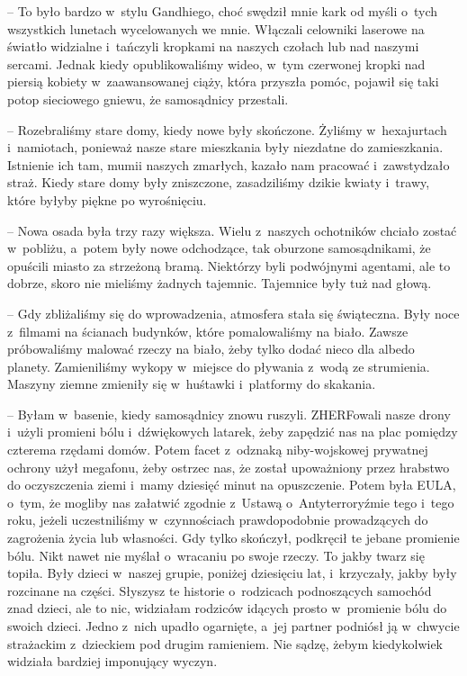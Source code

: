 \documentclass[oneside,polish,11pt,sfheadings]{mwbk}
\begin{document}
-- To było bardzo w~stylu Gandhiego, choć swędził mnie kark od myśli o~tych wszystkich lunetach wycelowanych we mnie. Włączali celowniki
laserowe na światło widzialne i~tańczyli kropkami na naszych czołach lub
nad naszymi sercami. Jednak kiedy opublikowaliśmy wideo, w~tym czerwonej
kropki nad piersią kobiety w~zaawansowanej ciąży, która przyszła pomóc,
pojawił się taki potop sieciowego gniewu, że samosądnicy przestali.

-- Rozebraliśmy stare domy, kiedy nowe były skończone. Żyliśmy w~hexajurtach i~namiotach, ponieważ nasze stare mieszkania były niezdatne
do zamieszkania. Istnienie ich tam, mumii naszych zmarłych, kazało nam
pracować i~zawstydzało straż. Kiedy stare domy były zniszczone,
zasadziliśmy dzikie kwiaty i~trawy, które byłyby piękne po wyrośnięciu.

-- Nowa osada była trzy razy większa. Wielu z~naszych ochotników chciało
zostać w~pobliżu, a~potem były nowe odchodzące, tak oburzone
samosądnikami, że opuścili miasto za strzeżoną bramą. Niektórzy byli
podwójnymi agentami, ale to dobrze, skoro nie mieliśmy żadnych tajemnic.
Tajemnice były tuż nad głową.

-- Gdy zbliżaliśmy się do wprowadzenia, atmosfera stała się świąteczna.
Były noce z~filmami na ścianach budynków, które pomalowaliśmy na biało.
Zawsze próbowaliśmy malować rzeczy na biało, żeby tylko dodać nieco dla
albedo planety. Zamieniliśmy wykopy w~miejsce do pływania z~wodą ze
strumienia. Maszyny ziemne zmieniły się w~huśtawki i~platformy do
skakania.

-- Byłam w~basenie, kiedy samosądnicy znowu ruszyli. ZHERFowali nasze
drony i~użyli promieni bólu i~dźwiękowych latarek, żeby zapędzić nas na
plac pomiędzy czterema rzędami domów. Potem facet z~odznaką
niby-wojskowej prywatnej ochrony użył megafonu, żeby ostrzec nas, że
został upoważniony przez hrabstwo do oczyszczenia ziemi i~mamy dziesięć
minut na opuszczenie. Potem była EULA, o~tym, że mogliby nas załatwić
zgodnie z~Ustawą o~Antyterroryźmie tego i~tego roku, jeżeli
uczestniliśmy w~czynnościach prawdopodobnie prowadzących do zagrożenia
życia lub własności. Gdy tylko skończył, podkręcił te jebane promienie
bólu. Nikt nawet nie myślał o~wracaniu po swoje rzeczy. To jakby twarz
się topiła. Były dzieci w~naszej grupie, poniżej dziesięciu lat, i~krzyczały, jakby były rozcinane na części. Słyszysz te historie o~rodzicach podnoszących samochód znad dzieci, ale to nic, widziałam
rodziców idących prosto w~promienie bólu do swoich dzieci. Jedno z~nich
upadło ogarnięte, a~jej partner podniósł ją w~chwycie strażackim z~dzieckiem pod drugim ramieniem. Nie sądzę, żebym kiedykolwiek widziała
bardziej imponujący wyczyn.
\end{document}
